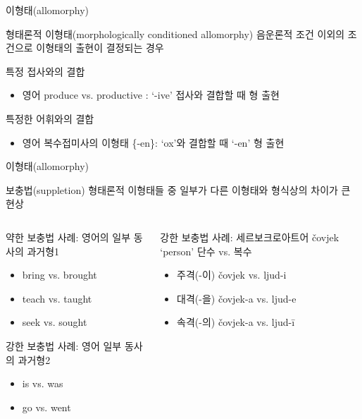 \documentclass[11pt, aspectratio=169]{beamer}
\newcommand{\texttnr}[1]{{\tnrfont #1}}
\newcommand{\textds}[1]{{\ipafont #1}}
\begin{document}
\begin{frame}[t]{이형태(allomorphy)}
  \begin{block}{형태론적 이형태(morphologically conditioned allomorphy)}
    음운론적 조건 이외의 조건으로 이형태의 출현이 결정되는 경우
  \end{block}
  특정 접사와의 결합
  \begin{itemize}
    \item 영어 produce \textds{[pɹədus]} vs. productive \textds{[prədʌktɪv]}: ‘-ive’ 접사와 결합할 때 \textds{[prədʌkt]}형 출현
  \end{itemize}
  특정한 어휘와의 결합
  \begin{itemize}
    \item 영어 복수접미사의 이형태 \{-en\}: ‘ox’와 결합할 때 ‘-en’ 형 출현
  \end{itemize}
\end{frame}

\begin{frame}[t]{이형태(allomorphy)}
  \begin{block}{보충법(suppletion)}
    형태론적 이형태들 중 일부가 다른 이형태와 형식상의 차이가 큰 현상
  \end{block}
  \begin{columns}
    \begin{column}[T]{0.46\textwidth}
      약한 보충법 사례: 영어의 일부 동사의 과거형1
      \begin{itemize}
        \item bring \textds{[bɹɪŋ]} vs. brought \textds{[bɹɔt]}
        \item teach \textds{[titʃ]} vs. taught \textds{[tɔt]}
        \item seek \textds{[sik]} vs. sought \textds{[sɔt]}
      \end{itemize}
      강한 보충법 사례: 영어 일부 동사의 과거형2
      \begin{itemize}
        \item is \textds{[ɪz]} vs. was \textds{[wʌz]} 
        \item go \textds{[goʊ]} vs. went \textds{[wɛnt]}
      \end{itemize}
    \end{column}
    \begin{column}[T]{0.47\textwidth}
      강한 보충법 사례: 세르보크로아트어 \texttnr{č}ovjek ‘person’ 단수 vs. 복수
      \begin{itemize}
        \item 주격(-이) \texttnr{č}ovjek vs. ljud-i
        \item 대격(-을) \texttnr{č}ovjek-a vs. ljud-e
        \item 속격(-의) \texttnr{č}ovjek-a vs. ljud-ī
      \end{itemize}
    \end{column}
  \end{columns}
\end{frame}
\end{document}
